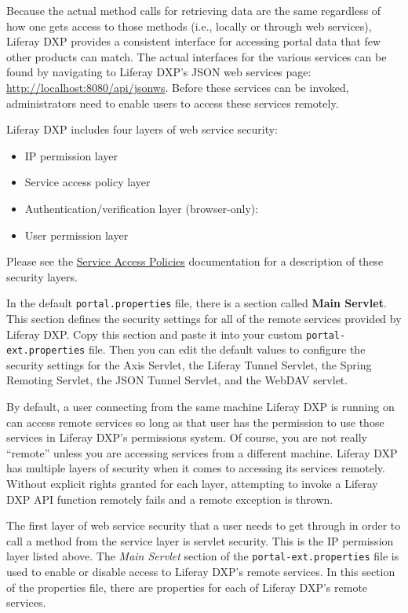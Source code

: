 Because the actual method calls for retrieving data are the same
regardless of how one gets access to those methods (i.e., locally or
through web services), Liferay DXP provides a consistent interface for
accessing portal data that few other products can match. The actual
interfaces for the various services can be found by navigating to
Liferay DXP's JSON web services page:
\url{http://localhost:8080/api/jsonws}. Before these services can be
invoked, administrators need to enable users to access these services
remotely.

Liferay DXP includes four layers of web service security:

\begin{itemize}
\tightlist
\item
  IP permission layer
\item
  Service access policy layer
\item
  Authentication/verification layer (browser-only):
\item
  User permission layer
\end{itemize}

Please see the
\href{/docs/7-0/deploy/-/knowledge_base/d/service-access-policies}{Service
Access Policies} documentation for a description of these security
layers.

In the default \texttt{portal.properties} file, there is a section
called \textbf{Main Servlet}. This section defines the security settings
for all of the remote services provided by Liferay DXP. Copy this
section and paste it into your custom \texttt{portal-ext.properties}
file. Then you can edit the default values to configure the security
settings for the Axis Servlet, the Liferay Tunnel Servlet, the Spring
Remoting Servlet, the JSON Tunnel Servlet, and the WebDAV servlet.

By default, a user connecting from the same machine Liferay DXP is
running on can access remote services so long as that user has the
permission to use those services in Liferay DXP's permissions system. Of
course, you are not really ``remote'' unless you are accessing services
from a different machine. Liferay DXP has multiple layers of security
when it comes to accessing its services remotely. Without explicit
rights granted for each layer, attempting to invoke a Liferay DXP API
function remotely fails and a remote exception is thrown.

The first layer of web service security that a user needs to get through
in order to call a method from the service layer is servlet security.
This is the IP permission layer listed above. The \emph{Main Servlet}
section of the \texttt{portal-ext.properties} file is used to enable or
disable access to Liferay DXP's remote services. In this section of the
properties file, there are properties for each of Liferay DXP's remote
services.

